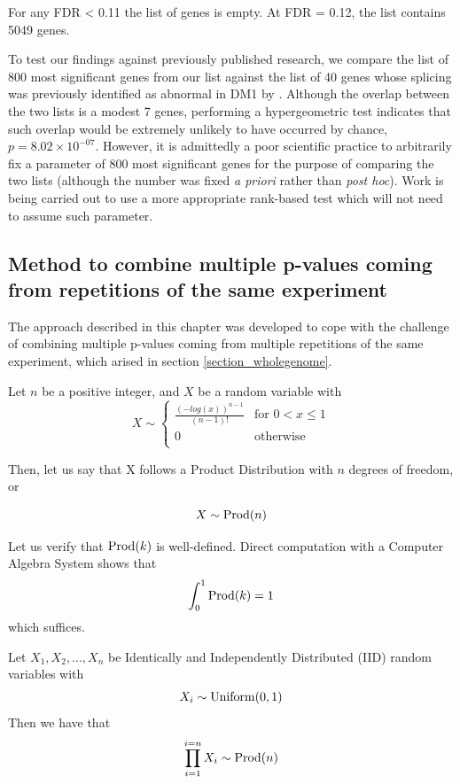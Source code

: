 For any FDR < 0.11 the list of genes is empty. At FDR = 0.12, the list contains 5049 genes.

To test our findings against previously published research, we compare the list of 800 most significant genes from our list against the list of 40 genes whose splicing was previously identified as abnormal in DM1 by \cite{Nakamori2013}. Although the overlap between the two lists is a modest 7 genes, performing a hypergeometric test indicates that such overlap would be extremely unlikely to have occurred by chance, $p = 8.02 × 10^{-07}$. However, it is admittedly a poor scientific practice to arbitrarily fix a parameter of 800 most significant genes for the purpose of comparing the two lists (although the number was fixed \textit{a priori} rather than \textit{post hoc}). Work is being carried out to use a more appropriate rank-based test which will not need to assume such parameter.

\subsection{Method to combine multiple p-values coming from repetitions of the same experiment} \label{pvalues}

The approach described in this chapter was developed to cope with the challenge of combining multiple p-values coming from multiple repetitions of the same experiment, which arised in section \ref{section_wholegenome}.

\begin{definition}

Let $n$ be a positive integer, and $X$ be a random variable with
$$
X \sim
\begin{cases}
  \frac{(-log(x))^{n-1}}{(n-1)!} & \text{for } 0 < x \leq 1 \\
  0 & \text{otherwise } \\
\end{cases}
$$

Then, let us say that X follows a Product Distribution with $n$ degrees of freedom, or

$$X \sim \operatorname{Prod}(n)$$

\end{definition}

Let us verify that $\operatorname{Prod}(k)$ is well-defined. Direct computation with a Computer Algebra System shows that $$\int_{0}^{1}\operatorname{Prod}(k)=1$$ which suffices.

\begin{lemma}

\label{lemmaProdUniform}

Let $X_{1}, X_{2}, ..., X_{n}$ be Identically and Independently Distributed (IID) random variables with $$X_{i} \sim \operatorname{Uniform}(0, 1)$$ Then we have that $$\prod_{i=1}^{i=n} X_{i} \sim \operatorname{Prod}(n)$$

\end{lemma}

